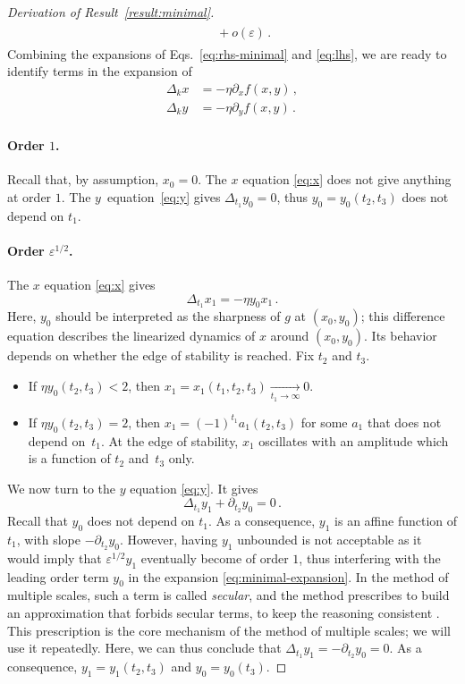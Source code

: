 \documentclass[11pt,english,reqno]{article}
\theoremstyle{plain}
\theoremstyle{definition}
\theoremstyle{remark}
\numberwithin{equation}{section}
\begin{document}
\begin{proof}[Derivation of Result~\ref{result:minimal}]
\begin{align}
\begin{split}
    &\quad+ o(\varepsilon) \, .
    \end{split}
\end{align}
Combining the expansions of Eqs.~\eqref{eq:rhs-minimal} and \eqref{eq:lhs}, we are ready to identify terms in the expansion of 
\begin{align}
    \Delta_k x &= -\eta \partial_x f(x,y) \, ,  \label{eq:x}\\
    \Delta_k y &= -\eta \partial_y f(x,y) \, . \label{eq:y}
\end{align}

\paragraph{Order $1$.} Recall that, by assumption, $x_0 = 0$. The $x$ equation \eqref{eq:x} does not give anything at order $1$. The $y$~equation~\eqref{eq:y} gives $\Delta_{t_1} y_0 = 0$, thus $y_0 = y_0(t_2, t_3)$ does not depend on $t_1$.

\paragraph{Order $\varepsilon^{1/2}$.} The $x$ equation \eqref{eq:x} gives 
\begin{equation*}
    \Delta_{t_1} x_1 = - \eta y_0 x_1 \, .
\end{equation*}
Here, $y_0$ should be interpreted as the sharpness of $g$ at $(x_0, y_0)$; this difference equation describes the linearized dynamics of $x$ around $(x_0, y_0)$. Its behavior depends on whether the edge of stability is reached. Fix $t_2$ and $t_3$. 
\begin{itemize}
    \item If $\eta y_0(t_2, t_3) < 2$, then $x_1 = x_1(t_1,t_2, t_3) \xrightarrow[t_1 \to \infty]{} 0$. 
    \item If $\eta y_0(t_2, t_3) = 2$, then $x_1 = (-1)^{t_1} a_1(t_2, t_3)$ for some $a_1$ that does not depend on~$t_1$. At the edge of stability, $x_1$ oscillates with an amplitude which is a function of $t_2$ and~$t_3$ only. 
\end{itemize}
We now turn to the $y$ equation \eqref{eq:y}. It gives
\begin{equation*}
    \Delta_{t_1} y_1 + \partial_{t_2} y_0 = 0 \, . 
\end{equation*}
Recall that $y_0$ does not depend on $t_1$. As a consequence, $y_1$ is an affine function of $t_1$, with slope $-\partial_{t_2} y_0$. However, having $y_1$ unbounded is not acceptable as it would imply that $\varepsilon^{1/2} y_1$ eventually become of order $1$, thus interfering with the leading order term $y_0$ in the expansion \eqref{eq:minimal-expansion}. In the method of multiple scales, such a term is called \emph{secular}, and the method prescribes to build an approximation that forbids secular terms, to keep the reasoning consistent \cite{holmes2012introduction}. This prescription is the core mechanism of the method of multiple scales; we will use it repeatedly. Here, we can thus conclude that $\Delta_{t_1} y_1 = -\partial_{t_2} y_0 = 0$. As a consequence, $y_1 = y_1(t_2, t_3)$ and $y_0 = y_0(t_3)$.


\end{proof}
\end{document}
